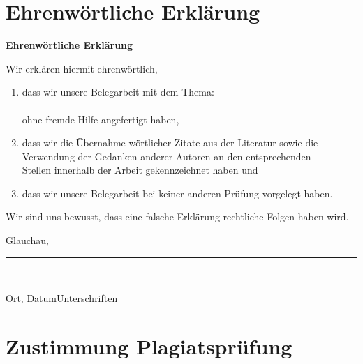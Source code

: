 
\cleardoublepage 
\section{Ehrenwörtliche Erklärung}
\vspace*{1cm}
\begin{center}
\huge\textbf{Ehrenwörtliche Erklärung}\\
\end{center}
\vspace*{1cm}
\normalsize
Wir erklären hiermit ehrenwörtlich,

\begin{enumerate}
	\vspace{1cm}
	\item dass wir unsere Belegarbeit mit dem Thema:\\
	
	\textbf{\titel }\\

	ohne fremde Hilfe angefertigt haben,
	\item dass wir die Übernahme wörtlicher Zitate aus der Literatur sowie die\\ 		  
	Verwendung der Gedanken anderer Autoren an den entsprechenden\\
	Stellen innerhalb der Arbeit gekennzeichnet haben und
	\item dass wir unsere Belegarbeit bei keiner anderen Prüfung vorgelegt haben.\\[1,5cm]
\end{enumerate}
Wir sind uns bewusst, dass eine falsche Erklärung rechtliche Folgen haben wird.\\[1,5cm]
		
\vfill

Glauchau, \abgabedatum\newline\noindent\rule{0.35\columnwidth}{0.4pt}\hspace{0.05\columnwidth}\rule{0.6\columnwidth}{0.4pt}\\
Ort, Datum\hspace{0.27\columnwidth}Unterschriften


\newpage
\section{Zustimmung Plagiatsprüfung}

\vspace*{2mm}

